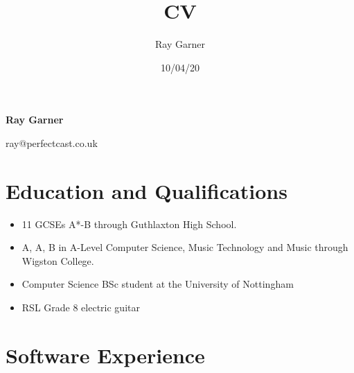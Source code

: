 \documentclass{article}
\title{CV}
\date{10/04/20}
\author{Ray Garner}
\makeatletter
\renewcommand{\maketitle}{
\vskip -5cm
\begin{center}


{\huge\bfseries
Ray Garner}

\vskip 0.25cm

{\large
ray@perfectcast.co.uk}

\vskip 1cm

\end{center}
}
\makeatother
\begin{document}
\maketitle



\section{Education and Qualifications}

\begin{itemize}[noitemsep]

\item 11 GCSEs A*-B through Guthlaxton High School.
\item A, A, B in A-Level Computer Science, Music Technology and Music through Wigston College.
\item Computer Science BSc student at the University of Nottingham
\item RSL Grade 8 electric guitar

\end{itemize}

\section{Software Experience}
\end{document}
